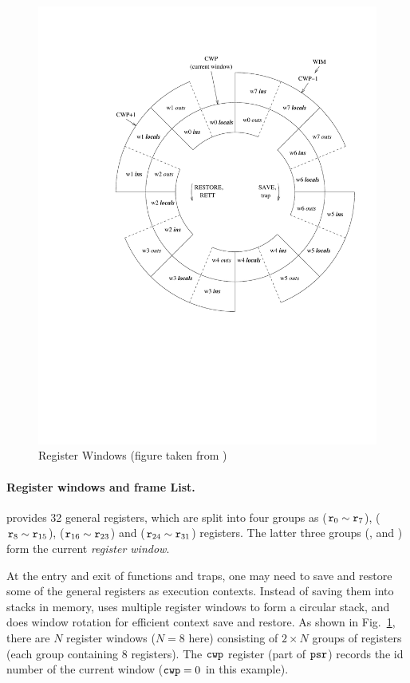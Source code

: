 \begin{figure}[!t]
	\centering
	\includegraphics[width=55ex]{window}
	\caption{Register Windows (figure taken from \cite{sparc})}
	\label{fig:RegisterWindows}
\end{figure}

\paragraph{\textbf{Register windows and frame List.}}
\sparc{} provides 32 general registers, which are split into
four groups
as \globalRN{} ($\texttt{r}_{0} \sim \texttt{r}_{7}$),
\outRN{} ($\texttt{r}_{8} \sim \texttt{r}_{15}$), \localRN ($\texttt{r}_{16} \sim \texttt{r}_{23}$)
and \inRN{} ($\texttt{r}_{24} \sim \texttt{r}_{31}$) registers.
The latter three groups (\outRN{}, \localRN{} and \inRN{})
form the current {\em register window}.

At the entry and exit of functions and traps, one may need to
save and restore some of the general registers as execution
contexts. Instead of saving them into stacks in memory,
\sparc{} uses multiple register windows to form a circular
stack, and does window rotation for efficient context save and restore.
As shown in Fig.~\ref{fig:RegisterWindows}, there are $N$
register windows ($N=8$ here) consisting of $2\times N$
groups of registers (each group containing 8 registers).
The $\texttt{cwp}$ register (part of $\texttt{psr}$) records the id number
of the current window ($\texttt{cwp}=0$ in this example).

